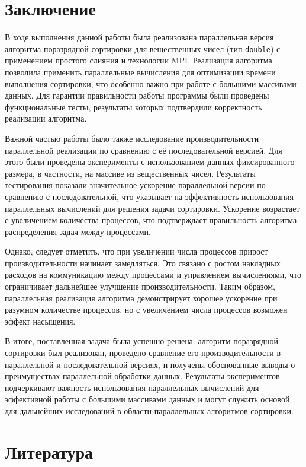 \documentclass[12pt]{article}
\begin{document}
\section{Заключение}

\hspace*{1.25em}В ходе выполнения данной работы была реализована параллельная версия алгоритма поразрядной сортировки для вещественных чисел (тип \texttt{double}) с применением простого слияния и технологии MPI. Реализация алгоритма позволила применить параллельные вычисления для оптимизации времени выполнения сортировки, что особенно важно при работе с большими массивами данных. Для гарантии правильности работы программы были проведены функциональные тесты, результаты которых подтвердили корректность реализации алгоритма.

Важной частью работы было также исследование производительности параллельной реализации по сравнению с её последовательной версией. Для этого были проведены эксперименты с использованием данных фиксированного размера, в частности, на массиве из вещественных чисел. Результаты тестирования показали значительное ускорение параллельной версии по сравнению с последовательной, что указывает на эффективность использования параллельных вычислений для решения задачи сортировки. Ускорение возрастает с увеличением количества процессов, что подтверждает правильность алгоритма распределения задач между процессами.

Однако, следует отметить, что при увеличении числа процессов прирост производительности начинает замедляться. Это связано с ростом накладных расходов на коммуникацию между процессами и управлением вычислениями, что ограничивает дальнейшее улучшение производительности. Таким образом, параллельная реализация алгоритма демонстрирует хорошее ускорение при разумном количестве процессов, но с увеличением числа процессов возможен эффект насыщения.

В итоге, поставленная задача была успешно решена: алгоритм поразрядной сортировки был реализован, проведено сравнение его производительности в параллельной и последовательной версиях, и получены обоснованные выводы о преимуществах параллельной обработки данных. Результаты экспериментов подчеркивают важность использования параллельных вычислений для эффективной работы с большими массивами данных и могут служить основой для дальнейших исследований в области параллельных алгоритмов сортировки.


\section*{Литература}
\end{document}
